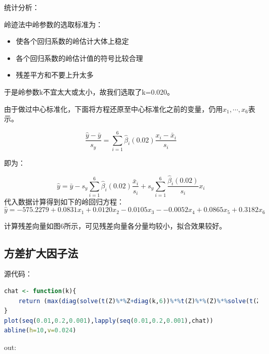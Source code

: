\documentclass[a4paper,12pt]{article}
\begin{document}
统计分析：

岭迹法中岭参数的选取标准为：
\begin{itemize}
	\item 使各个回归系数的岭估计大体上稳定
	\item 各个回归系数的岭估计值的符号比较合理
	\item 残差平方和不要上升太多
\end{itemize}

于是岭参数k不宜太大或太小，故我们选取了k=0.020。

由于做过中心标准化，下面将方程还原至中心标准化之前的变量，仍用$x_1,\cdots,x_6$表示。

$$\frac{\hat{y}-\bar{y}}{s_y}=\sum_{i=1}^{6}\hat{\beta}_i (0.02) \frac{x_i-\bar{x}_i}{s_i}$$

即为：

$$\hat{y}=\bar{y}-s_y \sum_{i=1}^{6} \hat{\beta}_i (0.02) \frac{\bar{x}_i}{s_i} + s_y \sum_{i=1}^{6} \frac{\hat{\beta}_i (0.02)}{s_i} x_i$$
代入数据计算得到如下的岭回归方程：
$$\hat{y}=-575.2279+0.0831x_1+0.0120x_2-0.0105x_3--0.0052x_4+0.0865x_5+0.3182x_6$$

计算残差向量如图6所示，可见残差向量各分量均较小，拟合效果较好。

\subsection{方差扩大因子法}

源代码：

\begin{lstlisting}[language=r,breaklines]
chat <- function(k){
	return (max(diag(solve(t(Z)%*%Z+diag(k,6))%*%t(Z)%*%(Z)%*%solve(t(Z)%*%Z+diag(k,6)))))
}
plot(seq(0.01,0.2,0.001),lapply(seq(0.01,0.2,0.001),chat))
abline(h=10,v=0.024)
\end{lstlisting}

out: 
\end{document}

